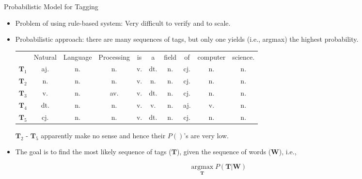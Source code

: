 \documentclass[11pt, handout]{beamer}
\newcommand{\argmaxF}{\mathop{\mathrm{argmax}}\limits}
\begin{document}
\begin{frame}{Probabilistic Model for Tagging}

\begin{itemize}[<+->]
 \item Problem of using rule-based system: Very difficult to verify and to scale. 
 \item Probabilistic approach: there are many sequences of tags,  but only one yields (i.e., argmax) the highest probability. %
 
 \begin{tabular}{cccccccccc}
~ &  \scriptsize Natural & \scriptsize Language & \scriptsize Processing &  is &  a & \scriptsize field &  of & \scriptsize computer & \scriptsize science.  \\
$\mathbf{T}_1$ & aj. & n. & n. & v.  & dt. & n. & cj. & n. & n. \\
$\mathbf{T}_2$ & n. & n. & n. & v.  & n. & n. & cj. & n. & n. \\
$\mathbf{T}_3$ & v. & n. & av. & v.  & dt. & n. & cj. & n. & n. \\
$\mathbf{T}_4$ & dt. & n. & n. & v.  & v. & n. & aj. & v. & n.\\ 
$\mathbf{T}_5$ & cj. & n. & n. & v.  & dt. & n. & cj. & n. & n.
\end{tabular} 
 
$\mathbf{T}_2$ - $\mathbf{T}_5$ apparently make no sense and hence their $P()$'s are very low. 
 

% 



\item 
The goal is to find the most likely sequence of tags ($\mathbf{T}$), given the sequence of words ($\mathbf{W}$), i.e., 

$$
\argmaxF_\mathbf{T}  P(\mathbf{T}|\mathbf{W})
$$

\end{itemize}

\end{frame}
\end{document}
